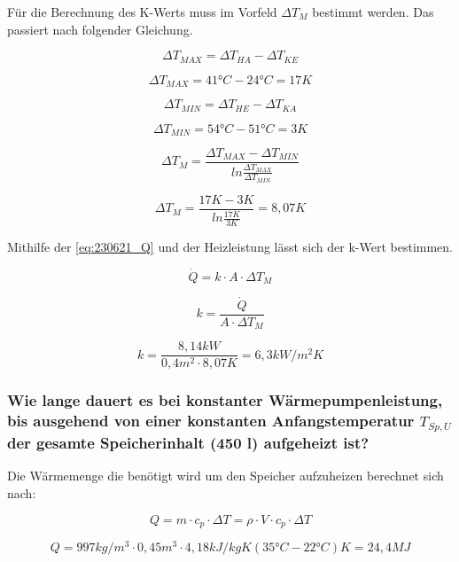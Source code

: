 Für die Berechnung des K-Werts muss im Vorfeld $\Delta T_M$ bestimmt werden. Das passiert nach folgender Gleichung.

\begin{equation}
    \Delta T_{MAX}= \Delta T_{HA}-\Delta T_{KE}
    \label{eq:230621_DeltaTMAX}
\end{equation}

$$\Delta T_{MAX}= 41\text{°}C-24 \text{°} C= 17K$$

\begin{equation}
    \Delta T_{MIN}= \Delta T_{HE}-\Delta T_{KA}
    \label{eq:230621_DeltaTMIN}
\end{equation}

$$\Delta T_{MIN}= 54 \text{°} C-51 \text{°} C= 3K$$

\begin{equation}
    \Delta T_{M}= \frac{\Delta T_{MAX}-\Delta T_{MIN}}{ln\frac{\Delta T_{MAX}}{\Delta T_{MIN}}}
    \label{eq:230621_DeltaTM}
\end{equation}

$$\Delta T_M= \frac{17K-3K}{ln\frac{17K}{3K}}= 8,07K$$

Mithilfe der \autoref{eq:230621_Q} und der Heizleistung lässt sich der k-Wert bestimmen.

\begin{equation}
    \dot{Q}=k\cdot A \cdot \Delta T_M
    \label{eq:230621_Q}
\end{equation}

\begin{equation}
    k = \frac{\dot{Q}}{ A \cdot \Delta T_M} 
    \label{eq:230621_k}
\end{equation}

$$k=\frac{8,14 kW}{ 0,4m^2 \cdot 8,07K}=6,3 kW/m^2K$$

\subsubsection{Wie lange dauert es bei konstanter Wärmepumpenleistung, bis ausgehend von einer
konstanten Anfangstemperatur \texorpdfstring{$T_{Sp,U}$}{} der gesamte Speicherinhalt (450 l) aufgeheizt ist?}

Die Wärmemenge die benötigt wird um den Speicher aufzuheizen berechnet sich nach:

\begin{equation}
Q = m \cdot c_p \cdot \Delta T = \rho \cdot V \cdot c_p \cdot \Delta T
\end{equation}

$$Q= 997 kg/m^3 \cdot 0,45 m^3 \cdot 4,18 kJ/kgK (35 \text{°} C-22 \text{°} C)K=24,4 MJ$$

